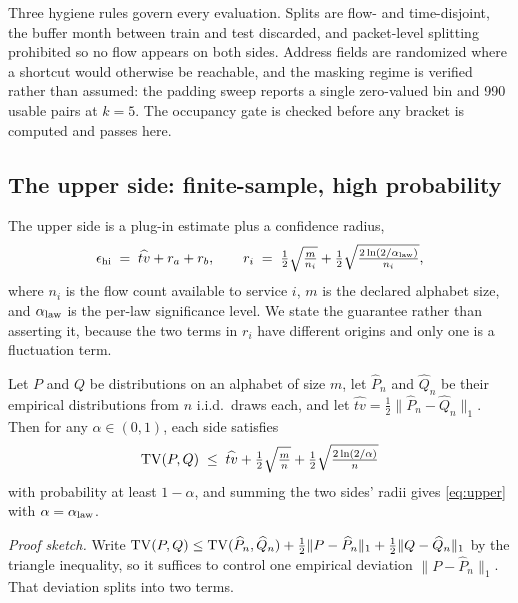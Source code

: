 Three hygiene rules govern every evaluation. Splits are flow- and
time-disjoint, the buffer month between train and test discarded, and
packet-level splitting prohibited so no flow appears on both sides. Address
fields are randomized where a shortcut would otherwise be reachable, and the
masking regime is verified rather than assumed: the padding sweep reports a
single zero-valued bin and 990 usable pairs at $k{=}5$. The occupancy gate is
checked before any bracket is computed and passes here.

\subsection{The upper side: finite-sample, high probability}
\label{sec:design/upper}

The upper side is a plug-in estimate plus a confidence radius,
\begin{equation}
  \epsilon_{\mathrm{hi}} \;=\; \widehat{tv} + r_a + r_b, \qquad
  r_i \;=\; \tfrac{1}{2}\sqrt{\tfrac{m}{n_i}}
        + \tfrac{1}{2}\sqrt{\tfrac{2\ln(2/\alpha_{\mathrm{law}})}{n_i}},
  \label{eq:upper}
\end{equation}
where $n_i$ is the flow count available to service $i$, $m$ is the declared
alphabet size, and $\alpha_{\mathrm{law}}$ is the per-law significance level. We state the
guarantee rather than asserting it, because the two terms in $r_i$ have
different origins and only one is a fluctuation term.

\begin{lemma}
\label{lem:upper}
Let $P$ and $Q$ be distributions on an alphabet of size $m$, let
$\widehat{P}_n$ and $\widehat{Q}_n$ be their empirical distributions from $n$
i.i.d.\ draws each, and let
$\widehat{tv} = \tfrac{1}{2}\lVert \widehat{P}_n - \widehat{Q}_n\rVert_1$.
Then for any $\alpha \in (0,1)$, each side satisfies
\begin{equation}
  \mathrm{TV}(P,Q) \;\le\; \widehat{tv}
  + \tfrac{1}{2}\sqrt{\tfrac{m}{n}} + \tfrac{1}{2}\sqrt{\tfrac{2\ln(2/\alpha)}{n}}
  \label{eq:lem}
\end{equation}
with probability at least $1-\alpha$, and summing the two sides' radii gives
\eqref{eq:upper} with $\alpha = \alpha_{\mathrm{law}}$.
\end{lemma}

\emph{Proof sketch.} Write
$\mathrm{TV}(P,Q) \le \mathrm{TV}(\widehat{P}_n,\widehat{Q}_n)
+ \tfrac{1}{2}\lVert P - \widehat{P}_n\rVert_1
+ \tfrac{1}{2}\lVert Q - \widehat{Q}_n\rVert_1$
by the triangle inequality, so it suffices to control one empirical deviation
$\lVert P - \widehat{P}_n\rVert_1$. That deviation splits into two terms.

